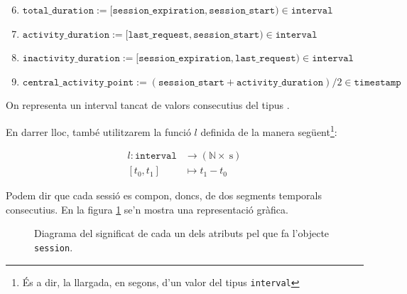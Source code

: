 \documentclass[
	a4paper,
	twoside,
	justified
]{tufte-book}
\begin{document}
\begin{fullwidth}
\begin{enumerate}[(1)]
	\setcounter{enumi}{5}
	\vspace{2\parskip}
	\item $\texttt{total\_duration} := [\texttt{session\_expiration}, \texttt{session\_start}) \in \texttt{interval}$
	\item $\texttt{activity\_duration} := [\texttt{last\_request}, \texttt{session\_start}) \in \texttt{interval}$
	\item $\texttt{inactivity\_duration} := [\texttt{session\_expiration}, \texttt{last\_request}) \in \texttt{interval}$
	\item $\texttt{central\_activity\_point} :=
	 (\texttt{session\_start} + \texttt{activity\_duration}) / 2 \in \texttt{timestamp}$ 
		\vspace{2\parskip}
\end{enumerate}
\end{fullwidth}

On  representa un interval tancat de valors consecutius del tipus . 

En darrer lloc, també utilitzarem la funció $l$ definida de la manera següent\footnote{És a dir, la llargada, en segons, d'un valor del tipus \texttt{interval}}:

\begin{align*}
l : \texttt{interval} & \rightarrow (\mathbb{N} \times \SI{}{\second}) \\
[t_0, t_1] & \mapsto t_1 - t_0   
\end{align*}

Podem dir que cada sessió es compon, doncs, de dos segments temporals consecutius. En la figura \ref{dia:session_structure} se'n mostra una representació gràfica.

\begin{figure}

\caption{
	\label{dia:session_structure}
	Diagrama del significat de cada un dels atributs pel que fa l'objecte \texttt{session}. 
}
\end{figure}
\end{document}
